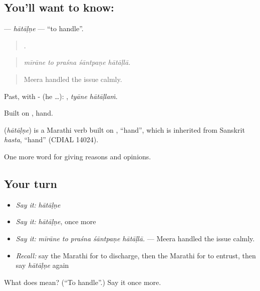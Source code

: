 \subsection*{You'll want to know: }
\textbf{} — \emph{hātāḷṇe} — \textquotedblleft{}to handle\textquotedblright{}.

\begin{quote}
    .
\end{quote}

\begin{quote}
\emph{mīrāne to praśna śāntpaṇe hātāḷlā.}
\end{quote}

\begin{quote}
Meera handled the issue calmly.
\end{quote}

Past, with - (he …):  , \emph{tyāne hātāḷlaṁ}.

Built on , hand.

\begin{cousinweb}
\textbf{} (\emph{hātāḷṇe}) is a Marathi verb built on , \textquotedblleft{}hand\textquotedblright{}, which is inherited from Sanskrit \emph{hasta}, \textquotedblleft{}hand\textquotedblright{} (CDIAL 14024).
\end{cousinweb}

\begin{grammarlens}[title={What you've built}]
One more word for giving reasons and opinions.
\end{grammarlens}

\subsection*{Your turn}
\begin{itemize}
\raggedright
  \item \emph{Say it:} \emph{hātāḷṇe}
  \item \emph{Say it:} \emph{hātāḷṇe}, once more
  \item \emph{Say it:} \emph{mīrāne to praśna śāntpaṇe hātāḷlā.} — Meera handled the issue calmly.
  \item \emph{Recall:} say the Marathi for to discharge, then the Marathi for to entrust, then say \emph{hātāḷṇe} again
\end{itemize}

\begin{tcolorbox}[breakable,colback=teal!4,colframe=teal!35!black,title={Before you move on}]
What does  mean? (\textquotedblleft{}To handle\textquotedblright{}.) Say it once more.
\end{tcolorbox}
